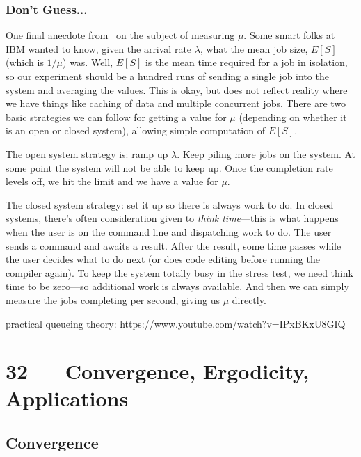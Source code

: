 \documentclass[a4paper]{report}
\begin{document}
\subsection*{Don't Guess...}
One final anecdote from~\cite{pmd} on the subject of measuring $\mu$. Some smart folks at IBM wanted to know, given the arrival rate $\lambda$, what the mean job size, $E[S]$ (which is $1/\mu$) was. Well, $E[S]$ is the mean time required for a job in isolation, so our experiment should be a hundred runs of sending a single job into the system and averaging the values. This is okay, but does not reflect reality where we have things like caching of data and multiple concurrent jobs. There are two basic strategies we can follow for getting a value for $\mu$ (depending on whether it is an open or closed system), allowing simple computation of $E[S]$.

The open system strategy is: ramp up $\lambda$. Keep piling more jobs on the system. At some point the system will not be able to keep up. Once the completion rate levels off, we hit the limit and we have a value for $\mu$.

The closed system strategy: set it up so there is always work to do. In closed systems, there's often consideration given to \textit{think time}---this is what happens when the user is on the command line and dispatching work to do. The user sends a command and awaits a result. After the result, some time passes while the user decides what to do next (or does code editing before running the compiler again). To keep the system totally busy in the stress test, we need think time to be zero---so additional work is always available. And then we can simply measure the jobs completing per second, giving us $\mu$ directly.




practical queueing theory:  https://www.youtube.com/watch?v=IPxBKxU8GIQ





\chapter*{32 --- Convergence, Ergodicity, Applications}


\section*{Convergence}
\end{document}
